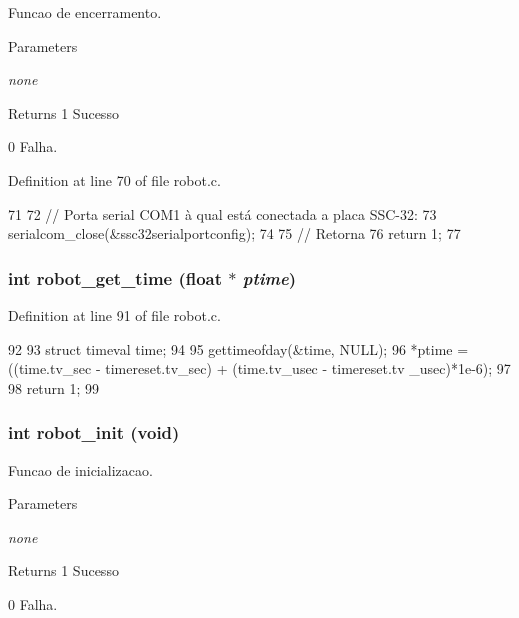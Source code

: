 Funcao de encerramento. 
\begin{DoxyParams}{Parameters}
\item[{\em none}]\end{DoxyParams}
\begin{DoxyReturn}{Returns}
1 Sucesso 

0 Falha. 
\end{DoxyReturn}


Definition at line 70 of file robot.c.


\begin{DoxyCode}
71 {
72         // Porta serial COM1 à qual está conectada a placa SSC-32:
73         serialcom_close(&ssc32serialportconfig);
74         
75         // Retorna 
76         return 1; 
77 }                      
\end{DoxyCode}
\subsubsection[{robot\_\-get\_\-time}]{\setlength{\rightskip}{0pt plus 5cm}int robot\_\-get\_\-time (float $\ast$ {\em ptime})}\label{robot_8h_a03c4523c04948fd5b818ea22bf84480a}


Definition at line 91 of file robot.c.


\begin{DoxyCode}
92 {
93         struct timeval time;
94 
95         gettimeofday(&time, NULL);
96         *ptime = ((time.tv_sec - timereset.tv_sec) + (time.tv_usec - timereset.tv
      _usec)*1e-6);
97         
98         return 1;
99 }
\end{DoxyCode}
\subsubsection[{robot\_\-init}]{\setlength{\rightskip}{0pt plus 5cm}int robot\_\-init (void)}\label{robot_8h_af0d5680f7a8a1290035e7506e6bd947f}


Funcao de inicializacao. 
\begin{DoxyParams}{Parameters}
\item[{\em none}]\end{DoxyParams}
\begin{DoxyReturn}{Returns}
1 Sucesso 

0 Falha. 
\end{DoxyReturn}


